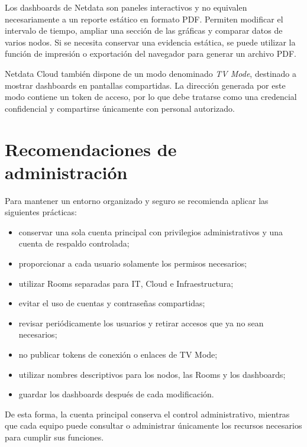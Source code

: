 Los dashboards de Netdata son paneles interactivos y no equivalen necesariamente a un
reporte estático en formato PDF. Permiten modificar el intervalo de tiempo, ampliar una
sección de las gráficas y comparar datos de varios nodos. Si se necesita conservar una
evidencia estática, se puede utilizar la función de impresión o exportación del navegador
para generar un archivo PDF.

Netdata Cloud también dispone de un modo denominado \textit{TV Mode}, destinado a
mostrar dashboards en pantallas compartidas. La dirección generada por este modo
contiene un token de acceso, por lo que debe tratarse como una credencial confidencial y
compartirse únicamente con personal autorizado.

\section{Recomendaciones de administración}

Para mantener un entorno organizado y seguro se recomienda aplicar las siguientes
prácticas:

\begin{itemize}
    \item conservar una sola cuenta principal con privilegios administrativos y una
          cuenta de respaldo controlada;
    \item proporcionar a cada usuario solamente los permisos necesarios;
    \item utilizar Rooms separadas para IT, Cloud e Infraestructura;
    \item evitar el uso de cuentas y contraseñas compartidas;
    \item revisar periódicamente los usuarios y retirar accesos que ya no sean
          necesarios;
    \item no publicar tokens de conexión o enlaces de TV Mode;
    \item utilizar nombres descriptivos para los nodos, las Rooms y los dashboards;
    \item guardar los dashboards después de cada modificación.
\end{itemize}

De esta forma, la cuenta principal conserva el control administrativo, mientras que cada
equipo puede consultar o administrar únicamente los recursos necesarios para cumplir
sus funciones.
